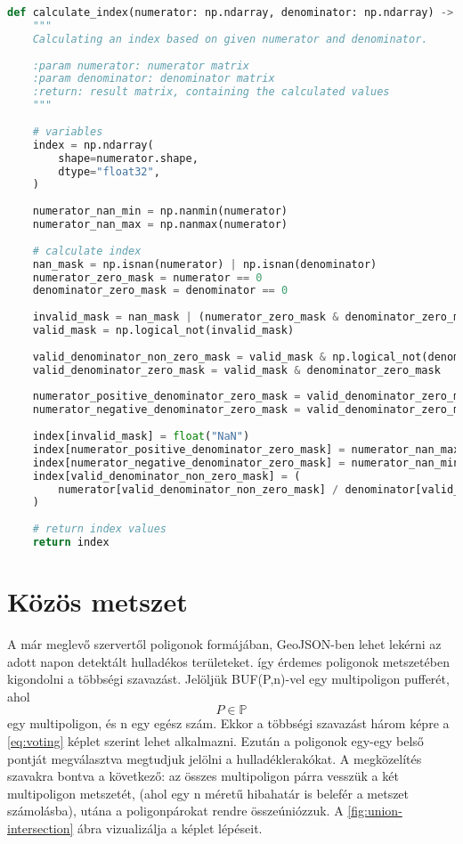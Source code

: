 \begin{lstlisting}[language={Python}]
def calculate_index(numerator: np.ndarray, denominator: np.ndarray) -> np.ndarray:
    """
    Calculating an index based on given numerator and denominator.
    
    :param numerator: numerator matrix
    :param denominator: denominator matrix
    :return: result matrix, containing the calculated values
    """
    
    # variables
    index = np.ndarray(
        shape=numerator.shape,
        dtype="float32",
    )
    
    numerator_nan_min = np.nanmin(numerator)
    numerator_nan_max = np.nanmax(numerator)
    
    # calculate index
    nan_mask = np.isnan(numerator) | np.isnan(denominator)
    numerator_zero_mask = numerator == 0
    denominator_zero_mask = denominator == 0
    
    invalid_mask = nan_mask | (numerator_zero_mask & denominator_zero_mask)
    valid_mask = np.logical_not(invalid_mask)
    
    valid_denominator_non_zero_mask = valid_mask & np.logical_not(denominator_zero_mask)
    valid_denominator_zero_mask = valid_mask & denominator_zero_mask
    
    numerator_positive_denominator_zero_mask = valid_denominator_zero_mask & (numerator > 0)
    numerator_negative_denominator_zero_mask = valid_denominator_zero_mask & (numerator < 0)
    
    index[invalid_mask] = float("NaN")
    index[numerator_positive_denominator_zero_mask] = numerator_nan_max
    index[numerator_negative_denominator_zero_mask] = numerator_nan_min
    index[valid_denominator_non_zero_mask] = (
        numerator[valid_denominator_non_zero_mask] / denominator[valid_denominator_non_zero_mask]
    )
    
    # return index values
    return index
\end{lstlisting}

\section{Közös metszet}
\label{ch:intersection}

A már meglevő szervertől poligonok formájában, GeoJSON-ben \cite{rfc7946} lehet lekérni az adott napon detektált hulladékos területeket. így érdemes poligonok metszetében kigondolni a többségi szavazást. Jelöljük BUF(P,n)-vel egy multipoligon pufferét, ahol $$P \in \mathbb{P}$$ egy multipoligon, és n egy egész szám. Ekkor a többségi szavazást három képre a \ref{eq:voting}  képlet szerint lehet alkalmazni. Ezután a poligonok egy-egy belső pontját megválasztva megtudjuk jelölni a hulladéklerakókat. A megközelítés szavakra bontva a következő: az összes multipoligon párra vesszük a két multipoligon metszetét, (ahol egy n méretű hibahatár is belefér a metszet számolásba), utána a poligonpárokat rendre összeúniózzuk. A \ref{fig:union-intersection} ábra vizualizálja a képlet lépéseit.

